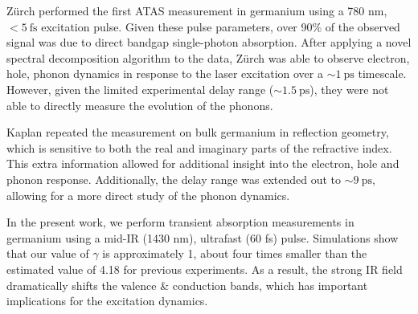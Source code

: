 Z\"{u}rch performed the first ATAS measurement in germanium using a 780 nm, $<5 \ \textrm{fs}$ excitation pulse. Given these pulse parameters, over 90\% of the observed signal was due to direct bandgap single-photon absorption. After applying a novel spectral decomposition algorithm to the data, Z\"{u}rch was able to observe electron, hole, phonon dynamics in response to the laser excitation over a $\sim 1 \ \textrm{ps}$ timescale. However, given the limited experimental delay range ($\sim 1.5 \ \textrm{ps}$), they were not able to directly measure the evolution of the phonons.

Kaplan repeated the measurement on bulk germanium in reflection geometry, which is sensitive to both the real and imaginary parts of the refractive index. This extra information allowed for additional insight into the electron, hole and phonon response. Additionally, the delay range was extended out to $\sim 9 \ \textrm{ps}$, allowing for a more direct study of the phonon dynamics.

In the present work, we perform transient absorption measurements in germanium using a mid-IR (1430 nm), ultrafast (60 fs) pulse. Simulations show that our value of $\gamma$ is approximately 1, about four times smaller than the estimated value of 4.18 for previous experiments. As a result, the strong IR field dramatically shifts the valence \& conduction bands, which has important implications for the excitation dynamics.

